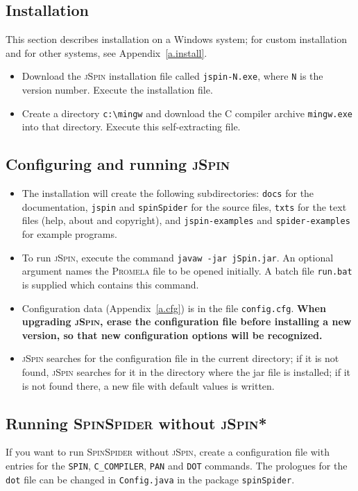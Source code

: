 \documentclass[11pt]{article}
\newcommand{\prm}{\textsc{Promela}}
\newcommand{\js}{\textsc{jSpin}}
\newcommand{\spd}{\textsc{SpinSpider}}
\newcommand{\dtf}{\texttt{dot}}
\newcommand{\p}[1]{\texttt{#1}}
\begin{document}
\subsection{Installation}
This section describes installation on a Windows system;
for custom installation and for other systems, see Appendix~\ref{a.install}.

\begin{itemize}
\item Download the \js{} installation file called \p{jspin-N.exe},
where \p{N} is the version number.
Execute the installation file.
\item Create a directory \verb=c:\mingw= and download the C 
compiler archive \p{mingw.exe} into that directory. Execute this self-extracting file.
\end{itemize}

\subsection{Configuring and running \js{}}
\begin{itemize}
\item The installation will create the following subdirectories: \p{docs} for the
documentation, \p{jspin} and \p{spinSpider} for the source files, 
\p{txts} for the text files
(help, about and copyright), and \p{jspin-examples} and \p{spider-examples}
for example programs.
\item To run \js{}, execute the command \p{javaw -jar jSpin.jar}.
An optional argument names the \prm{} file to be opened initially.
A batch file \p{run.bat} is supplied which contains this command.
\item Configuration data (Appendix~\ref{a.cfg}) is in the file
\p{config.cfg}.
\textbf{When upgrading \js{}, erase the configuration file before installing
a new version, so that new configuration options will be recognized.}
\item \js{} searches for the configuration file in the current
directory; if it is not found, \js{} searches for it in the directory
where the jar file is installed; if it is not found there, a new file
with default values is written.
\end{itemize}

\subsection{Running \spd{} without \js{}*}
If you want to run \spd{} without \js{}, create a configuration file
with entries for the \p{SPIN}, \p{C\_COMPILER}, \p{PAN} and \p{DOT}
commands. The prologues for the \dtf{} file can be changed in
\p{Config.java} in the package \p{spinSpider}.
\end{document}
